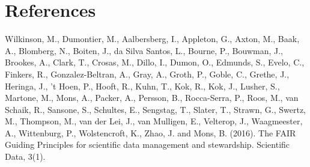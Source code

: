 \documentclass{article}
\begin{document}
\section{References}

Wilkinson, M., Dumontier, M., Aalbersberg, I., Appleton, G., Axton, M., Baak, A., Blomberg, N., Boiten, J., da Silva Santos, L., Bourne, P., Bouwman, J., Brookes, A., Clark, T., Crosas, M., Dillo, I., Dumon, O., Edmunds, S., Evelo, C., Finkers, R., Gonzalez-Beltran, A., Gray, A., Groth, P., Goble, C., Grethe, J., Heringa, J., ’t Hoen, P., Hooft, R., Kuhn, T., Kok, R., Kok, J., Lusher, S., Martone, M., Mons, A., Packer, A., Persson, B., Rocca-Serra, P., Roos, M., van Schaik, R., Sansone, S., Schultes, E., Sengstag, T., Slater, T., Strawn, G., Swertz, M., Thompson, M., van der Lei, J., van Mulligen, E., Velterop, J., Waagmeester, A., Wittenburg, P., Wolstencroft, K., Zhao, J. and Mons, B. (2016). The FAIR Guiding Principles for scientific data management and stewardship. Scientific Data, 3(1).
\end{document}
